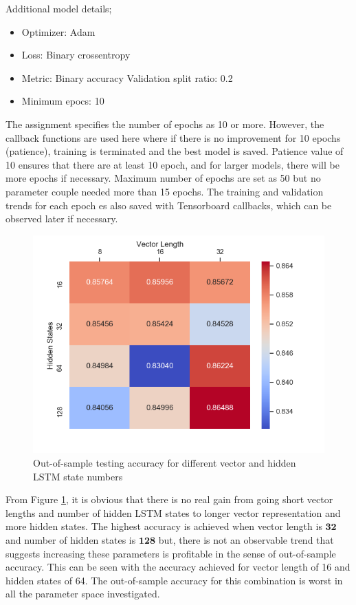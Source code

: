 \documentclass[11pt]{article}
\begin{document}
Additional model details;
\begin{itemize}
    \item Optimizer: Adam
    \item Loss: Binary crossentropy
    \item Metric: Binary accuracy
    Validation split ratio: 0.2
    \item Minimum epocs: 10
\end{itemize}

The assignment specifies the number of epochs as 10 or more. However, the callback functions are used here where if there is no improvement for 10 epochs (patience), training is terminated and the best model is saved. Patience value of 10 ensures that there are at least 10 epoch, and for larger models, there will be more epochs if necessary. Maximum number of epochs are set as 50 but no parameter couple needed more than 15 epochs. The training and validation trends for each epoch es also saved with Tensorboard callbacks, which can be observed later if necessary.

\begin{figure}[H]
\centering
\includegraphics[width=0.65\columnwidth]{pics/rnn_hyper.png}
\captionsetup{justification=centering}
\caption{Out-of-sample testing accuracy for different vector and hidden LSTM state numbers}
\label{fig:q1_acc}
\end{figure}

From Figure \ref{fig:q1_acc}, it is obvious that there is no real gain from going short vector lengths and number of hidden LSTM states to longer vector representation and more hidden states. The highest accuracy is achieved when vector length is $\bm{32}$ and number of hidden states is $\bm{128}$ but, there is not an observable trend that suggests increasing these parameters is profitable in the sense of out-of-sample accuracy. This can be seen with the accuracy achieved for vector length of 16 and hidden states of 64. The out-of-sample accuracy for this combination is worst in all the parameter space investigated.\medskip
\end{document}
